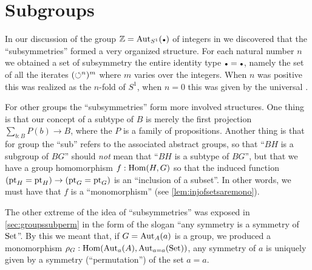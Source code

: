 \label{ch:subgroups}

\section{Subgroups}
\label{sec:subgroups}
In our discussion of the group $\ZZ=\aut_{S^1}(\base)$ of integers in we discovered that the ``subsymmetries'' formed a very organized structure.
For each natural number $n$ we obtained a set of subsymmetry the entire identity type $\base=\base$, namely the set of all the iterates $(\circlearrowleft^{n})^m$ where $m$ varies over the integers.
When $n$ was positive this was realized as the $n$-fold \covering of $S^1$, when $n=0$ this was given by the universal \covering.

For other groups the ``subsymmetries'' form more involved structures.
One thing is that our concept of a subtype of $B$ is merely the first projection $\sum_{b:B}P(b)\to B$, where the $P$ is a family of propositions.
Another thing is that for group the ``sub'' refers to the associated abstract groups, so that ``$BH$ is a subgroup of $BG$'' should \emph{not} mean that ``$BH$ is a subtype of $BG$'', but that we have a group homomorphism $f:\Hom(H,G)$ so that the induced function $(\mathrm{pt}_H=\mathrm{pt}_H)\to(\mathrm{pt}_G=\mathrm{pt}_G)$ is an ``inclusion of a subset''.
In other words, we must have that $f$ is a ``monomorphism'' (see \cref{lem:injofsetsaremono}).


The other extreme of the idea of ``subsymmetries'' was exposed in \cref{sec:groupssubperm} in the form of the slogan ``any symmetry is a symmetry of $\mathrm{Set}$''.
By this we meant that, if $G=\aut_A(a)$ is a group, we produced a monomorphism $\rho_G:\Hom(\aut_a(A),\aut_{a=a}(\Set))$, \ie any symmetry of $a$ is uniquely given by a symmetry (``permutation'') of the set $a=a$.


